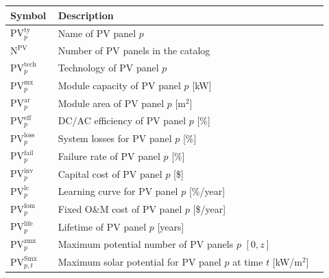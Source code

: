 \documentclass[11pt]{article}
\begin{document}
\begin{center}
\centering
\begin{tabular}{p{0.12\linewidth}p{0.8\linewidth}}
\hline
\textbf{Symbol} & \textbf{Description} \\
\hline
\(\text{PV}^\text{ty}_p\) & Name of PV panel \(p\) \\
\(\text{N}^\text{PV}\) & Number of PV panels in the catalog \\
\(\text{PV}^\text{tech}_p\) & Technology of PV panel \(p\) \\
\(\text{PV}^\text{mx}_p\) & Module capacity of PV panel \(p\) [kW] \\
\(\text{PV}^\text{ar}_p\) & Module area of PV panel \(p\) [m\(^2\)] \\
\(\text{PV}^\text{eff}_p\) & DC/AC efficiency of PV panel \(p\) [\%] \\
\(\text{PV}^\text{loss}_p\) & System losses for PV panel \(p\) [\%] \\
\(\text{PV}^\text{fail}_p\) & Failure rate of PV panel \(p\) [\%] \\
\(\text{PV}^\text{inv}_p\) & Capital cost of PV panel \(p\) [\$] \\
\(\text{PV}^\text{lc}_p\) & Learning curve for PV panel \(p\) [\%/year] \\
\(\text{PV}^\text{fom}_p\) & Fixed O\&M cost of PV panel \(p\) [\$/year] \\
\(\text{PV}^\text{life}_p\) & Lifetime of PV panel \(p\) [years] \\
\(\text{PV}^\text{zmx}_p\) & Maximum potential number of PV panels \(p\) \([0, z]\) \\
\(\text{PV}^\text{Smx}_{p,t}\) & Maximum solar potential for PV panel \(p\) at time \(t\) [kW/m\(^2\)] \\
\hline
\end{tabular}
\captionsetup{type=table}
\label{tab:pv_parameters}
\end{center}
\end{document}
